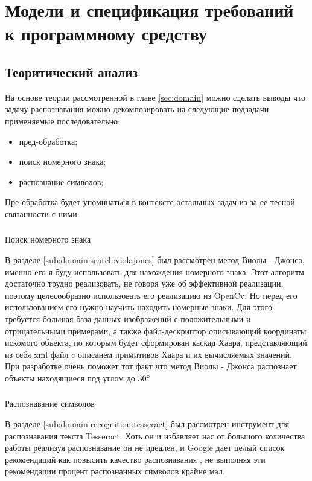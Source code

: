 \section{Модели и спецификация требований к программному средству}
\label{sec:funcreq}

\subsection{Теоритический анализ}

На основе теории рассмотренной в главе \ref{sec:domain} можно сделать выводы что задачу распознавания можно декомпозировать на следующие подзадачи применяемые последовательно:
\begin{itemize}
	\item пред-обработка;
	\item поиск номерного знака;
	\item распознание символов;
\end{itemize} 

Пре-обработка будет упоминаться в контексте остальных задач из за ее тесной связанности с ними.

\subsubsection{}
\label{seq:funcreq:analisys}
Поиск номерного знака

В разделе \ref{sub:domain:search:violajones} был рассмотрен метод Виолы - Джонса, именно его я буду использовать для нахождения номерного знака. Этот алгоритм достаточно трудно реализовать, не говоря уже об эффективной реализации, поэтому целесообразно использовать его реализацию из OpenCv. Но перед его использованием его нужно научить находить номерные знаки. Для этого требуется большая база данных изображений с положительными и отрицательными примерами, а также файл-дескриптор описывающий координаты искомого объекта, по которым будет сформирован каскад Хаара, представляющий из себя xml файл c описанем примитивов Хаара и их вычисляемых значений. При разработке очень поможет тот факт что метод Виолы - Джонса распознает объекты находящиеся под углом до $30\degree$

\subsubsection{}
Распознавание символов

В разделе \ref{sub:domain:recognition:tesseract} был рассмотрен инструмент для распознавания текста Tesseract. Хоть он и избавляет нас от большого количества работы реализуя распознавание он не идеален, и Google дает целый список рекомендаций как повысить качество распознавания \cite{tesseract_impruvment}, не выполняя эти рекомендации процент распознанных символов крайне мал.

